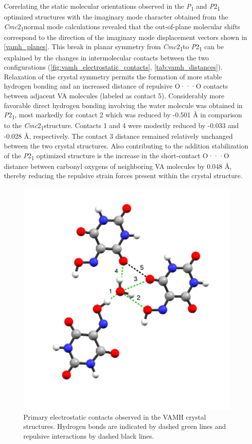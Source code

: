 Correlating the static molecular orientations observed in the \textit{P}\textsubscript{1} and \textit{P}2\textsubscript{1} optimized structures with the imaginary mode character obtained from the \textit{Cmc}2\textsubscript{1}normal mode calculations revealed that the out-of-plane molecular shifts correspond to the direction of the imaginary mode displacement vectors shown in \autoref{vamh_planes}. This break in planar symmetry from \textit{Cmc}2\textsubscript{1}to \textit{P}2\textsubscript{1} can be explained by the changes in intermolecular contacts between the two configurations (\autoref{fig:vamh_electrostatic_contacts}, \autoref{tab:vamh_distances}). Relaxation of the crystal symmetry permits the formation of more stable hydrogen bonding and an increased distance of repulsive O···O contacts between adjacent VA molecules (labeled as contact 5). Considerably more favorable direct hydrogen bonding involving the water molecule was obtained in \textit{P}2\textsubscript{1}, most markedly for contact 2 which was reduced by -0.501 Å in comparison to the \textit{Cmc}2\textsubscript{1}structure. Contacts 1 and 4 were modestly reduced by -0.033 and -0.028 Å, respectively. The contact 3 distance remained relatively unchanged between the two crystal structures. Also contributing to the addition stabilization of the \textit{P}2\textsubscript{1} optimized structure is the increase in the short-contact O···O distance between carbonyl oxygens of neighboring VA molecules by 0.048 Å, thereby reducing the repulsive strain forces present within the crystal structure.

\begin{figure}[ht!]
  \center
  \includegraphics[width=0.7\linewidth]{src/figures/VAMH_figures/VAMH_fig6.png}
  \caption{Primary electrostatic contacts observed in the VAMH crystal structures. Hydrogen bonds are indicated by dashed green lines and repulsive interactions by dashed black lines.}
  \label{fig:vamh_electrostatic_contacts}
\end{figure}

